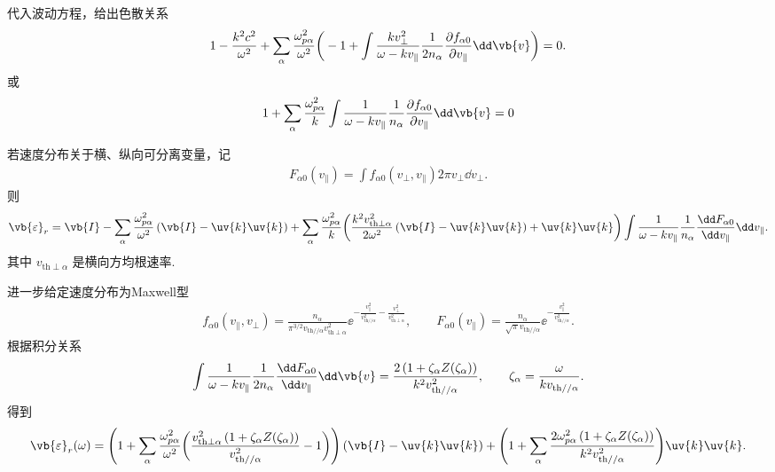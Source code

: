 \begin{exbox}
	代入波动方程，给出色散关系
	\begin{align*}
		1 - \frac{k^2c^2}{\omega^2} + \sum_\alpha\frac{\omega_{p\alpha}^2}{\omega^2}\bigg(-1 + \int\frac{k v_\perp^2}{\omega-k v_{\parallel}}\frac{1}{2n_\alpha}\frac{\partial f_{\alpha0}}{\partial v_{\parallel}}\dd \vb{v}\bigg) = 0.
	\end{align*}
	或
	\begin{align*}
		1 + \sum_\alpha\frac{\omega_{p\alpha}^2}{k}\int\frac{1}{\omega-k v_{\parallel}}\frac{1}{n_\alpha}\frac{\partial f_{\alpha0}}{\partial v_{\parallel}}\dd \vb{v} = 0
	\end{align*}
\end{exbox}

\begin{exbox}
	\label{eq:plasma_separable_xy}

	若速度分布关于横、纵向可分离变量，记
	\begin{align*}
		F_{\alpha0}(v_{\parallel}) = \int f_{\alpha0}(v_\perp,v_{\parallel})2\pi v_\perp\dd v_\perp.
	\end{align*}
	则
	\begin{align*}
		\vb{\varepsilon}_r = \vb{I} - \sum_\alpha\frac{\omega_{p\alpha}^2}{\omega^2}\left(\vb{I}-\uv{k}\uv{k}\right) + \sum_\alpha\frac{\omega_{p\alpha}^2}{k}\bigg(\frac{k^2v_{\mathrm{th}\perp\alpha}^2}{2\omega^2}\left(\vb{I}-\uv{k}\uv{k}\right)+\uv{k}\uv{k}\bigg)\int\frac{1}{\omega-k v_{\parallel}}\frac{1}{n_\alpha}\frac{\dd F_{\alpha0}}{\dd v_{\parallel}}\dd v_{\parallel}.
	\end{align*}
	其中 \(v_{\mathrm{th}\perp\alpha}\) 是横向方均根速率.

	进一步给定速度分布为Maxwell型
	\begin{align*}
		f_{\alpha0}(v_{\parallel},v_\perp) = \frac{n_\alpha}{\pi^{3/2}v_{\mathrm{th}//\alpha}v_{\mathrm{th}\perp\alpha}^2}\ee^{-\frac{v_{\parallel}^2}{v_{\mathrm{th}//\alpha}^2}-\frac{v_\perp^2}{v_{\mathrm{th}\perp\alpha}^2}},\qquad F_{\alpha0}(v_{\parallel}) = \frac{n_\alpha}{\sqrt{\pi}v_{\mathrm{th}//\alpha}}\ee^{-\frac{v_{\parallel}^2}{v_{\mathrm{th}//\alpha}^2}}.
	\end{align*}
	根据积分关系
	\begin{align*}
		\int\frac{1}{\omega-k v_{\parallel}}\frac{1}{2n_\alpha}\frac{\dd F_{\alpha0}}{\dd v_{\parallel}}\dd \vb{v} = \frac{2\left(1+\zeta_\alpha Z(\zeta_\alpha)\right)}{k^2v_{\mathrm{th}//\alpha}^2},\qquad \zeta_\alpha = \frac{\omega}{k v_{\mathrm{th}//\alpha}}.
	\end{align*}
	得到
	\begin{align*}
		\vb{\varepsilon}_r(\omega) = \Bigg(1 + \sum_\alpha\frac{\omega_{p\alpha}^2}{\omega^2}\bigg(\frac{v_{\mathrm{th}\perp\alpha}^2\left(1+\zeta_\alpha Z(\zeta_\alpha)\right)}{v_{\mathrm{th}//\alpha}^2}-1\bigg)\Bigg)\left(\vb{I}-\uv{k}\uv{k}\right) + \Bigg(1 + \sum_\alpha\frac{2\omega_{p\alpha}^2\left(1+\zeta_\alpha Z(\zeta_\alpha)\right)}{k^2v_{\mathrm{th}//\alpha}^2}\Bigg)\uv{k}\uv{k}.
	\end{align*}


\end{exbox}
